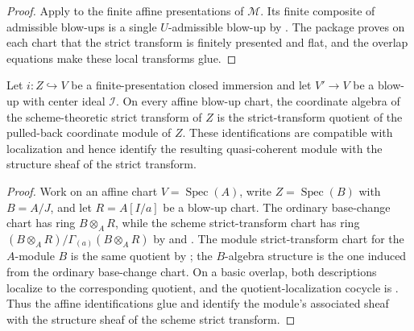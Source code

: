 \begin{proof}
  Apply  to the finite affine
  presentations of $\mathcal M$.  Its finite composite of admissible blow-ups
  is a single $U$-admissible blow-up by
  .  The package proves on each
  chart that the strict transform is finitely presented and flat, and the
  overlap equations make these local transforms glue.
\end{proof}

\begin{lemma}
  \label{lemma:nagata-strict-transform-closed-module-comparison}

  Let $i\colon Z\hookrightarrow V$ be a finite-presentation closed immersion
  and let $V'\to V$ be a blow-up with center ideal $\mathcal I$.  On every
  affine blow-up chart, the coordinate algebra of the scheme-theoretic strict
  transform of $Z$ is the strict-transform quotient of the pulled-back
  coordinate module of $Z$.  These identifications are compatible with
  localization and hence identify the resulting quasi-coherent module with
  the structure sheaf of the strict transform.
\end{lemma}

\begin{proof}
  Work on an affine chart $V=\operatorname{Spec}(A)$, write
  $Z=\operatorname{Spec}(B)$ with $B=A/J$, and let
  $R=A[I/a]$ be a blow-up chart.  The ordinary base-change chart has ring
  $B\otimes_A R$, while the scheme strict-transform chart has ring
  $(B\otimes_A R)/\Gamma_{(a)}(B\otimes_A R)$ by
   and
  .  The
  module strict-transform chart for the $A$-module $B$ is the same quotient
  by ; the $B$-algebra
  structure is the one induced from the ordinary base-change chart.  On a
  basic overlap, both descriptions localize to the corresponding quotient,
  and the quotient-localization cocycle is
  .  Thus the affine
  identifications glue and identify the module's associated sheaf with the
  structure sheaf of the scheme strict transform.
\end{proof}

